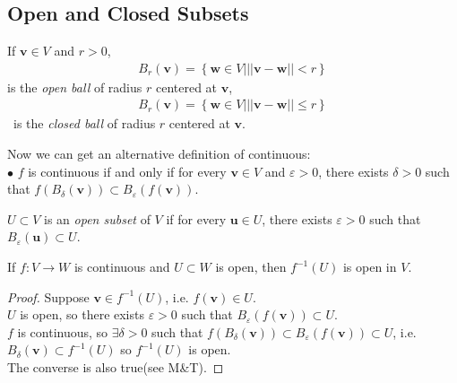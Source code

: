 \documentclass[a4paper]{article}
\begin{document}
\subsection{Open and Closed Subsets}

\begin{defi}
If $\mathbf{v}\in V$ and $r>0$,
\begin{equation*}
\begin{aligned}
B_r\left(\mathbf{v}\right) = \left\{\mathbf{w}\in V| ||\mathbf{v}-\mathbf{w}|| < r\right\}
\end{aligned}
\end{equation*}
is the \emph{open ball} of radius $r$ centered at $\mathbf{v}$,
\begin{equation*}
\begin{aligned}
B_r\left(\mathbf{v}\right) = \left\{\mathbf{w}\in V| ||\mathbf{v}-\mathbf{w}|| \leq r\right\}
\end{aligned}
\end{equation*}\
is the \emph{closed ball} of radius $r$ centered at $\mathbf{v}$.
\end{defi}

Now we can get an alternative definition of continuous:\\
$\bullet$ $f$ is continuous if and only if for every $\mathbf{v}\in V$ and $\varepsilon > 0$, there exists $\delta > 0$ such that $f\left(B_\delta\left(\mathbf{v}\right)\right) \subset B_\varepsilon\left(f\left(\mathbf{v}\right)\right)$.

\begin{defi}
$U \subset V$ is an \emph{open subset} of $V$ if for every $\mathbf{u} \in U$, there exists $\varepsilon > 0$ such that $B_\varepsilon\left(\mathbf{u}\right) \subset U$.
\end{defi}

\begin{prop}
If $f:V\to W$ is continuous and $U \subset W$ is open, then $f^{-1} \left(U\right)$ is open in $V$.
\begin{proof}
Suppose $\mathbf{v} \in f^{-1}\left(U\right)$, i.e. $f\left(\mathbf{v}\right) \in U$.\\
$U$ is open, so there exists $\varepsilon > 0$ such that $B_\varepsilon\left(f\left(\mathbf{v}\right)\right) \subset U$.\\
$f$ is continuous, so $\exists \delta > 0$ such that $f\left(B_\delta \left(\mathbf{v}\right)\right) \subset B_\varepsilon\left(f\left(\mathbf{v}\right)\right) \subset U$, i.e. $B_\delta\left(\mathbf{v}\right) \subset f^{-1} \left(U\right)$ so $f^{-1}\left(U\right)$ is open.\\
The converse is also true(see M\&T).
\end{proof}
\end{prop}
\end{document}
